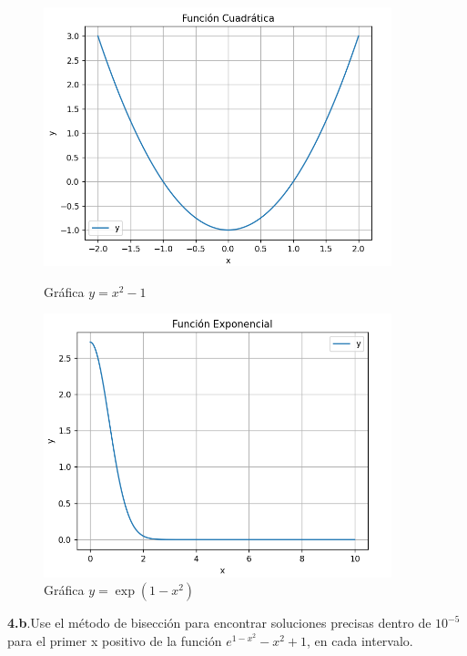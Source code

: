\documentclass[12pt]{article}
\begin{document}
\begin{figure}[H]
    \centering
    \begin{minipage}{0.5\textwidth}
        \centering
        \includegraphics[width=0.9\textwidth]{./inFiles/Figures/Cap5.png}
        \caption{Gráfica \( y = x^2-1 \)}
    \end{minipage}%
    \begin{minipage}{0.5\textwidth}
        \centering
        \includegraphics[width=0.9\textwidth]{./inFiles/Figures/Cap6.png}
        \caption{Gráfica \( y = \exp(1-x^2) \)}
    \end{minipage}
\end{figure}

\textbf{4.b}.Use el método de bisección para encontrar soluciones precisas dentro de $10^{-5}$ para el primer x positivo de la función $e^{1-x^2}-x^2+1$, en cada intervalo.
\end{document}
